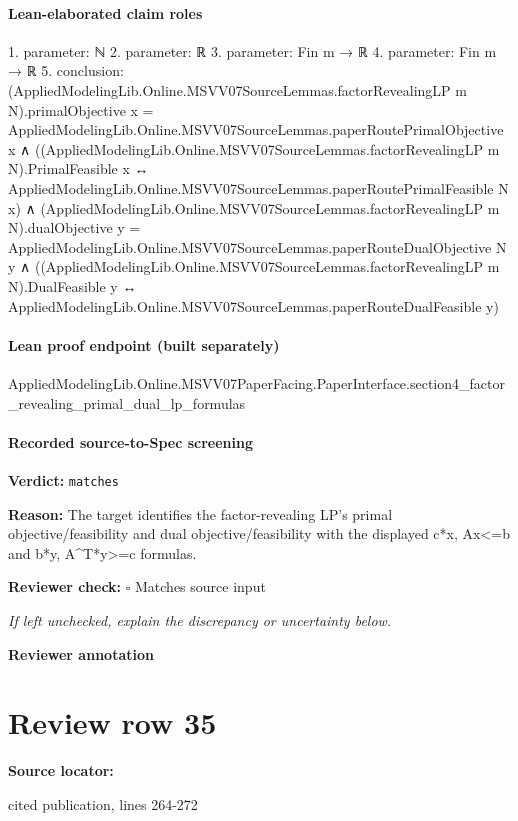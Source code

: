 \documentclass[10pt]{article}
\newcommand{\reviewerbox}{%
  \par\noindent\fbox{\parbox{0.96\linewidth}{\rule{0pt}{0.38in}}}\par
}
\newcommand{\reviewmatch}[1]{%
  \par\noindent\textbf{Reviewer check:} $\square$\; #1\par
  \noindent\emph{If left unchecked, explain the discrepancy or uncertainty below.}\par
}
\begin{document}
\paragraph{Lean-elaborated claim roles}\begin{ReviewVerbatim}
1. parameter: ℕ
2. parameter: ℝ
3. parameter: Fin m → ℝ
4. parameter: Fin m → ℝ
5. conclusion: (AppliedModelingLib.Online.MSVV07SourceLemmas.factorRevealingLP m N).primalObjective x =
    AppliedModelingLib.Online.MSVV07SourceLemmas.paperRoutePrimalObjective x ∧
  ((AppliedModelingLib.Online.MSVV07SourceLemmas.factorRevealingLP m N).PrimalFeasible x ↔
      AppliedModelingLib.Online.MSVV07SourceLemmas.paperRoutePrimalFeasible N x) ∧
    (AppliedModelingLib.Online.MSVV07SourceLemmas.factorRevealingLP m N).dualObjective y =
        AppliedModelingLib.Online.MSVV07SourceLemmas.paperRouteDualObjective N y ∧
      ((AppliedModelingLib.Online.MSVV07SourceLemmas.factorRevealingLP m N).DualFeasible y ↔
        AppliedModelingLib.Online.MSVV07SourceLemmas.paperRouteDualFeasible y)
\end{ReviewVerbatim}

\paragraph{Lean proof endpoint (built separately)}\begin{ReviewVerbatim}
AppliedModelingLib.Online.MSVV07PaperFacing.PaperInterface.section4_factor_revealing_primal_dual_lp_formulas
\end{ReviewVerbatim}

\paragraph{Recorded source-to-Spec screening}
\textbf{Verdict:} \texttt{matches}
\\
{\raggedright
\textbf{Reason:} The target identifies the factor-\allowbreak{}revealing LP's primal objective/\allowbreak{}feasibility and dual objective/\allowbreak{}feasibility with the displayed c*x, Ax<=b and b*y, A\textasciicircum{}T*y>=c formulas.\allowbreak{}
\par}
\reviewmatch{Matches source input}
\noindent\textbf{Reviewer annotation}\par
\reviewerbox
\clearpage
\hypertarget{source-claim-ba169acec000963c}{}
\section*{Review row 35}
\textbf{Source locator:} {\footnotesize\raggedright cited publication, lines 264-\allowbreak{}272\par}
\end{document}
